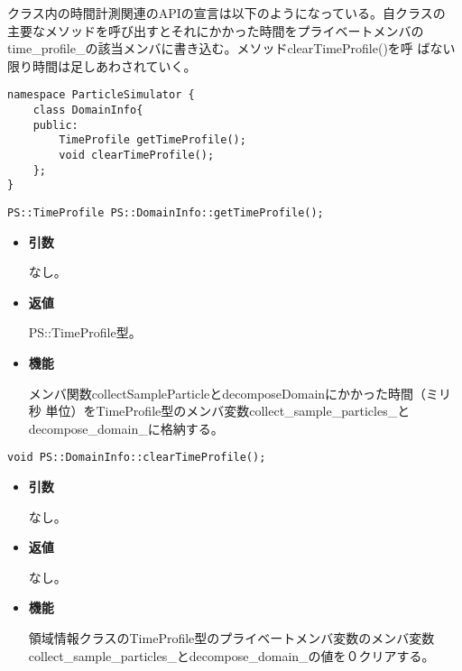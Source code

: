 
クラス内の時間計測関連のAPIの宣言は以下のようになっている。自クラスの
主要なメソッドを呼び出すとそれにかかった時間をプライベートメンバの
time\_profile\_の該当メンバに書き込む。メソッドclearTimeProfile()を呼
ばない限り時間は足しあわされていく。

\begin{lstlisting}[caption=DomainInfo3]
namespace ParticleSimulator {
    class DomainInfo{
    public:
        TimeProfile getTimeProfile();
        void clearTimeProfile();
    };
}
\end{lstlisting}

\begin{screen}
\begin{verbatim}
PS::TimeProfile PS::DomainInfo::getTimeProfile();
\end{verbatim}
\end{screen}

\begin{itemize}

\item {\bf 引数}

なし。

\item {\bf 返値}

PS::TimeProfile型。

\item {\bf 機能}

メンバ関数collectSampleParticleとdecomposeDomainにかかった時間（ミリ秒
単位）をTimeProfile型のメンバ変数collect\_sample\_particles\_と
decompose\_domain\_に格納する。

\end{itemize}

\begin{screen}
\begin{verbatim}
void PS::DomainInfo::clearTimeProfile();
\end{verbatim}
\end{screen}

\begin{itemize}

\item {\bf 引数}

なし。

\item {\bf 返値}

なし。

\item {\bf 機能}

領域情報クラスのTimeProfile型のプライベートメンバ変数のメンバ変数
collect\_sample\_particles\_とdecompose\_domain\_の値を０クリアする。

\end{itemize}

